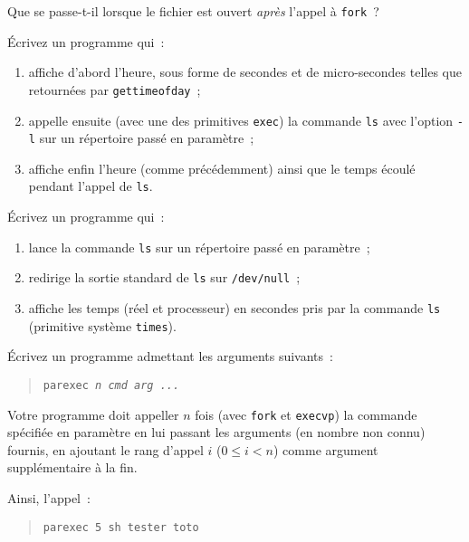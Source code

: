 Que se passe-t-il lorsque le fichier est ouvert {\em après} l'appel à
{\tt fork}~?


\question

Écrivez un programme qui~:

\begin {enumerate}
    \item affiche d'abord l'heure, sous forme de secondes et de
	micro-secondes telles que retournées par \texttt {gettimeofday}~;

    \item appelle ensuite (avec une des primitives \texttt {exec})
	la commande \texttt {ls} avec l'option \texttt {-l} sur un
	répertoire passé en paramètre~;

    \item affiche enfin l'heure (comme précédemment) ainsi que le
	temps écoulé pendant l'appel de \texttt {ls}.

\end {enumerate}


\question

Écrivez un programme qui~:

\begin {enumerate}
    \item lance la commande {\tt ls} sur un répertoire passé en
        paramètre~;
    \item redirige la sortie standard de {\tt ls} sur {\tt /dev/null}~;
    \item affiche les temps (réel et processeur) en secondes
	pris par la commande {\tt ls} (primitive système {\tt times}).
\end {enumerate}


\question

Écrivez un programme admettant les arguments suivants~:

\begin {quote}
    \texttt {parexec \textit {n cmd arg ...}}
\end {quote}

Votre programme doit appeller $n$ fois (avec \texttt {fork} et \texttt
{execvp}) la commande spécifiée en paramètre en lui passant les
arguments (en nombre non connu) fournis, en ajoutant le rang d'appel $i$
($0 \leq i < n$) comme argument supplémentaire à la fin.

Ainsi, l'appel~:

\begin {quote}
    \texttt {parexec 5 sh tester toto}
\end {quote}

